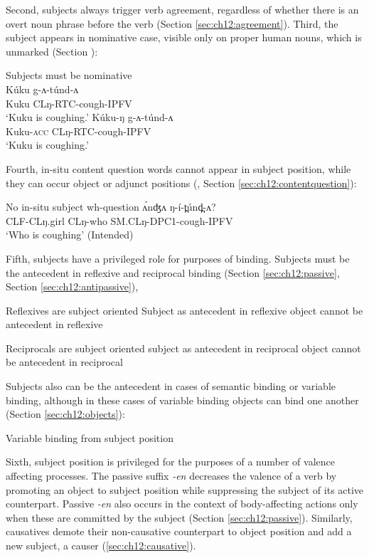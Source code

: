 Second, subjects always trigger verb agreement, regardless of whether there is an overt noun phrase before the verb (Section \ref{sec:ch12:agreement}). Third, the subject appears in nominative case, visible only on proper human nouns, which is unmarked (Section \label{ex:ch12:2}):

\ea Subjects must be nominative \label{ex:ch12:2}\\
\ea \gll Kúku g-ʌ-túnd-ʌ\\
Kuku CLŋ-RTC-cough-IPFV\\
\glt `Kuku is coughing.'
\ex \gll *Kúku-ŋ g-ʌ-túnd-ʌ\\
Kuku-\textsc{acc} CLŋ-RTC-cough-IPFV\\
\glt `Kuku is coughing.'
\z 
\z 

Fourth, in-situ content question words cannot appear in subject position, while they can occur object or adjunct positions (\citealt{roseetal14}, Section \ref{sec:ch12:contentquestion}): 

\ea No in-situ subject wh-question \label{ex:ch12:3}
\ea \gll ʌ́nʤʌ	ŋ-í-t̪únd̪-ʌ?	            \\
		CLF-CLŋ.girl	CLŋ-who	SM.CLŋ-DPC1-cough-IPFV\\
    \glt `Who is coughing' (Intended)
\z 
\z 

Fifth, subjects have a privileged role for purposes of binding. Subjects must be the antecedent in reflexive and reciprocal binding (Section \ref{sec:ch12:passive}, Section \ref{sec:ch12:antipassive}), 

\ea Reflexives are subject oriented
\ea Subject as antecedent in reflexive
\ex object cannot be antecedent in reflexive
\z 
\z 

\ea Reciprocals are subject oriented
\ea subject as antecedent in reciprocal
\ex object cannot be antecedent in reciprocal
\z 
\z 

Subjects also can be the antecedent in cases of semantic binding or variable binding, although in these cases of variable binding objects can bind one another (Section \ref{sec:ch12:objects}):

\ea Variable binding from subject position
\z 

Sixth, subject position is privileged for the purposes of a number of valence affecting processes. The passive suffix \textit{-en} decreases the valence of a verb by promoting an object to subject position while suppressing the subject of its active counterpart. Passive \textit{-en} also occurs in the context of body-affecting actions only when these are committed by the subject (Section \ref{sec:ch12:passive}). Similarly, causatives demote their non-causative counterpart to object position and add a new subject, a causer (\ref{sec:ch12:causative}).

